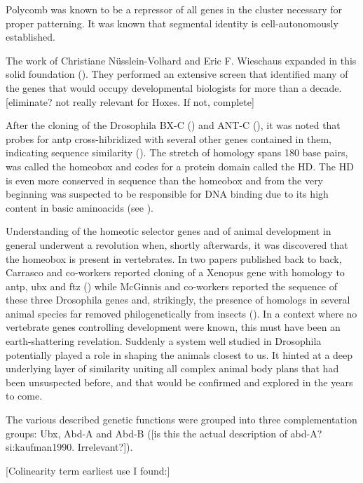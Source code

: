 Polycomb was known to be a repressor of all genes in the cluster necessary for proper patterning. It was known that segmental identity is cell-autonomously established. 

The work of Christiane Nüsslein-Volhard and Eric F. Wieschaus expanded in this solid foundation (\cite{Nuesslein-Volhard1980}). They performed an extensive screen that identified many of the genes that would occupy developmental biologists for more than a decade. [eliminate? not really relevant for Hoxes. If not, complete]

After the cloning of the Drosophila \ac{BX-C} (\cite{Bender1983}) and \ac{ANT-C} (\cite{Garber1983,Scott1983}), it was noted that probes for \ac{antp} cross-hibridized with several other genes contained in them, indicating sequence similarity (\cite{McGinnis1984}).  The stretch of homology spans 180 base pairs, was called the homeobox and codes for a protein domain called the \ac{HD}. The \ac{HD} is even more conserved in sequence than the homeobox and from the very beginning was suspected to be responsible for DNA binding due to its high content in basic aminoacids (see \cite{Gehring1985}).

Understanding of the homeotic selector genes and of animal development in general underwent a revolution when, shortly afterwards, it was discovered that the homeobox is present in vertebrates. In two papers published back to back, Carrasco and co-workers reported cloning of a Xenopus gene with homology to \ac{antp}, \ac{ubx} and \ac{ftz} (\cite{Carrasco1984}) while McGinnis and co-workers reported the sequence of these three Drosophila genes and, strikingly, the presence of homologs in several animal species far removed philogenetically from insects (\cite{McGinnis1984b}). In a context where no vertebrate genes controlling development were known, this must have been an earth-shattering revelation. Suddenly a system well studied in Drosophila potentially played a role in shaping the animals closest to us. It hinted at a deep underlying layer of similarity uniting all complex animal body plans that had been unsuspected before, and that would be confirmed and explored in the years to come.

The various described genetic functions were grouped into three complementation groups: Ubx, Abd-A and Abd-B (\cite{Sanchez-Herrero1985}[is this the actual description of abd-A?si:kaufman1990. Irrelevant?]).

[Colinearity term earliest use I found:\cite{Lewis1985}]

